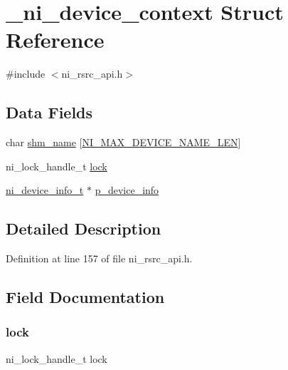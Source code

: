 \hypertarget{struct__ni__device__context}{}\section{\+\_\+ni\+\_\+device\+\_\+context Struct Reference}
\label{struct__ni__device__context}


{\ttfamily \#include $<$ni\+\_\+rsrc\+\_\+api.\+h$>$}

\subsection*{Data Fields}
\begin{DoxyCompactItemize}
\item 
char \mbox{\hyperlink{struct__ni__device__context_ada1a7b89b3d42ee9de8937df9ee48e12}{shm\+\_\+name}} \mbox{[}\mbox{\hyperlink{ni__rsrc__api_8h_a38deaa045e5ce61a183c8ceddc618d7e}{N\+I\+\_\+\+M\+A\+X\+\_\+\+D\+E\+V\+I\+C\+E\+\_\+\+N\+A\+M\+E\+\_\+\+L\+EN}}\mbox{]}
\item 
ni\+\_\+lock\+\_\+handle\+\_\+t \mbox{\hyperlink{struct__ni__device__context_ad70c9254e2a51831bfd8b769d977a6a9}{lock}}
\item 
\mbox{\hyperlink{ni__rsrc__api_8h_a37a9b9f89ba495d469222af27ce3058b}{ni\+\_\+device\+\_\+info\+\_\+t}} $\ast$ \mbox{\hyperlink{struct__ni__device__context_a68d7bd7ca36633b8821d38d967baf70e}{p\+\_\+device\+\_\+info}}
\end{DoxyCompactItemize}


\subsection{Detailed Description}


Definition at line 157 of file ni\+\_\+rsrc\+\_\+api.\+h.



\subsection{Field Documentation}
\mbox{\label{struct__ni__device__context_ad70c9254e2a51831bfd8b769d977a6a9}} 
\subsubsection{\texorpdfstring{lock}{lock}}
{\footnotesize\ttfamily ni\+\_\+lock\+\_\+handle\+\_\+t lock}



